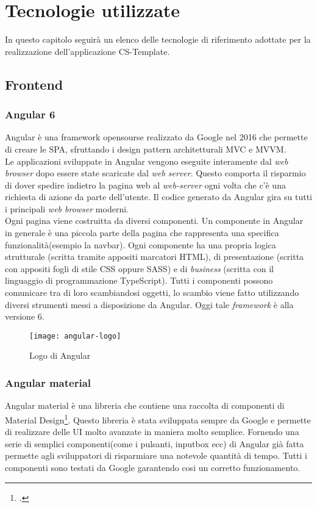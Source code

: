 
\chapter{Tecnologie utilizzate}
\label{cap:Tecnologie utilizzate}
In questo capitolo seguirà un elenco delle tecnologie di riferimento adottate per la realizzazione dell'applicazione CS-Template.
\section{Frontend}
\subsection{Angular 6}
Angular è una \gls{framework} opensourse realizzato da Google nel 2016 che permette di creare le \gls{SPA}, sfruttando i \gls{design
pattern} architetturali \gls{MVC} e \gls{MVVM}.
\\

Le applicazioni sviluppate in Angular vengono eseguite interamente dal \emph{web browser} dopo essere state scaricate dal \emph{web server}. Questo comporta il risparmio di dover spedire indietro la pagina web al \emph{web-server} ogni volta che c'è una richiesta di azione da parte dell'utente. Il codice generato da Angular gira su tutti i principali \emph{web browser} moderni.
\\

Ogni pagina viene costruitta da diversi componenti. Un componente in Angular in generale è una piccola parte della pagina che rappresenta una specifica funzionalità(esempio la navbar).   Ogni componente ha una propria logica
strutturale (scritta tramite appositi marcatori HTML), di presentazione (scritta con
appositi fogli di stile CSS oppure SASS) e di \emph{business} (scritta con il linguaggio di programmazione
TypeScript). Tutti i componenti possono comunicare tra di loro scambiandosi
oggetti, lo scambio viene fatto utilizzando diversi strumenti messi a disposizione da Angular. Oggi tale \emph{framework} è alla versione 6.
\begin{figure}[!h] 
	\centering 
	\texttt{[image: angular-logo]} 
	\caption{Logo di Angular}
\end{figure}

\subsection{Angular material}
Angular material è una libreria che contiene una raccolta di componenti di Material Design\footcite{https://material.io/design/}. Questo libreria è stata sviluppata sempre da Google e permette di realizzare delle \gls{UI} molto avanzate in maniera molto semplice. Fornendo una serie di semplici componenti(come i pulsanti, inputbox ecc) di Angular già fatta permette agli sviluppatori di risparmiare una notevole quantità di tempo. Tutti i componenti sono testati da Google garantendo cosi un corretto funzionamento.

